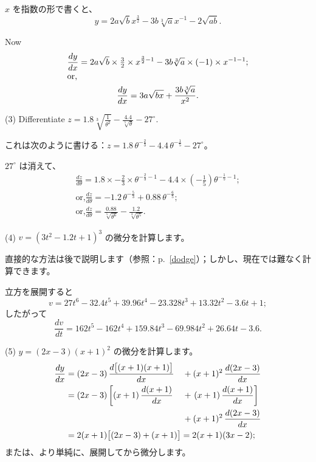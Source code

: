 \documentclass[a4paper,11pt,openany]{ltjsbook}
\newcommand{\lintertext}[1]{\intertext{#1}}
\newcommand{\Pageref}[2][p.]{#1~\ref{#2}}
\begin{document}
$x$ を指数の形で書くと、
\[
y = 2a\sqrt{b} x^{\frac{3}{2}} - 3b \sqrt[3]{a} x^{-1} - 2\sqrt{ab}.
\]

Now
\begin{gather*}
\frac{dy}{dx} = 2a\sqrt{b} \times \tfrac{3}{2} \times x^{\frac{3}{2}-1} - 3b\sqrt[3]{a} \times (-1) \times x^{-1-1}; \\
\lintertext{or,}
\frac{dy}{dx} = 3a\sqrt{bx} + \frac{3b\sqrt[3]{a}}{x^2}.
\end{gather*}

(3) Differentiate $z = 1.8 \sqrt[3]{\frac{1}{\theta^2}} - \frac{4.4}{\sqrt[5]{\theta}} - 27^\circ$.

これは次のように書ける：$z= 1.8\, \theta^{-\frac{2}{3}} - 4.4\, \theta^{-\frac{1}{5}} - 27^\circ$。

$27^\circ$ は消えて、
\begin{gather*}
\frac{dz}{d\theta}
  = 1.8 \times  -\tfrac{2}{3} \times  \theta^{-\frac{2}{3}-1}
  - 4.4 \times  \left(-\tfrac{1}{5}\right)\theta^{-\frac{1}{5}-1}; \\
\text{or,}
\frac{dz}{d\theta}
  = -1.2\, \theta^{-\frac{5}{3}} + 0.88\, \theta^{-\frac{6}{5}}; \\
\text{or,}
\frac{dz}{d\theta} = \frac{0.88}{\sqrt[5]{\theta^6}}
  - \frac{1.2}{\sqrt[3]{\theta^5}}.
\end{gather*}

(4) $v = (3t^2 - 1.2 t + 1)^3$ の微分を計算します。

直接的な方法は後で説明します（参照：\Pageref{dodge}）；しかし、現在では難なく計算できます。

立方を展開すると
\[
v = 27t^6 - 32.4t^5 + 39.96t^4 - 23.328t^3 + 13.32t^2 - 3.6t + 1;
\]
したがって
\[
\frac{dv}{dt} = 162t^5 - 162t^4 + 159.84t^3 - 69.984t^2 + 26.64t - 3.6.
\]

(5) $y = (2x - 3)(x + 1)^2$ の微分を計算します。
\begin{alignat*}{2}
\frac{dy}{dx}
  &= (2x - 3)\, \frac{d\bigl[(x + 1)(x + 1)\bigr]}{dx}
     &&+ (x + 1)^2\, \frac{d(2x - 3)}{dx} \\
  &= (2x - 3) \left[(x + 1)\, \frac{d(x + 1)}{dx}\right.
     &&+ \left.(x + 1)\, \frac{d(x + 1)}{dx}\right] \\
  &  &&+ (x + 1)^2\, \frac{d(2x - 3)}{dx} \\
  &= \rlap{$2(x + 1)\bigl[(2x - 3) + (x + 1)\bigr] = 2(x + 1)(3x - 2)$;}&&
\end{alignat*}
または、より単純に、展開してから微分します。
\end{document}
